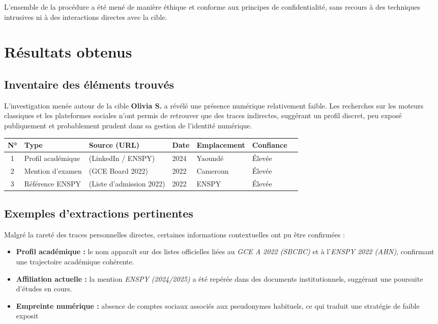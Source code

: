 \documentclass[a4paper,12pt]{report}
\begin{document}
L’ensemble de la procédure a été mené de manière éthique et conforme aux principes de confidentialité, sans recours à des techniques intrusives ni à des interactions directes avec la cible.


\chapter{Résultats obtenus}

\section{Inventaire des éléments trouvés}

L’investigation menée autour de la cible \textbf{Olivia S.} a révélé une présence numérique relativement faible.  
Les recherches sur les moteurs classiques et les plateformes sociales n’ont permis de retrouver que des traces indirectes, suggérant un profil discret, peu exposé publiquement et probablement prudent dans sa gestion de l’identité numérique.

\begin{center}
\begin{tabular}{@{}cllllll@{}}
\toprule
N° & Type & Source (URL) & Date & Emplacement  & Confiance \\
\midrule
1 & Profil académique & (LinkedIn / ENSPY) & 2024 & Yaoundé  & Élevée \\
2 & Mention d’examen & (GCE Board 2022) & 2022 & Cameroun  & Élevée \\
3 & Référence ENSPY & (Liste d’admission 2022) & 2022 & ENSPY  & Élevée \\
\bottomrule
\end{tabular}
\end{center}

\section{Exemples d’extractions pertinentes}

Malgré la rareté des traces personnelles directes, certaines informations contextuelles ont pu être confirmées :

\begin{itemize}
	\item \textbf{Profil académique :} le nom apparaît sur des listes officielles liées au \textit{GCE A 2022 (SBCBC)} et à l’\textit{ENSPY 2022 (AHN)}, confirmant une trajectoire académique cohérente.
	\item \textbf{Affiliation actuelle :} la mention \textit{ENSPY (2024/2025)} a été repérée dans des documents institutionnels, suggérant une poursuite d’études en cours.
	\item \textbf{Empreinte numérique :} absence de comptes sociaux associés aux pseudonymes habituels, ce qui traduit une stratégie de faible exposit
\end{itemize}
\end{document}
